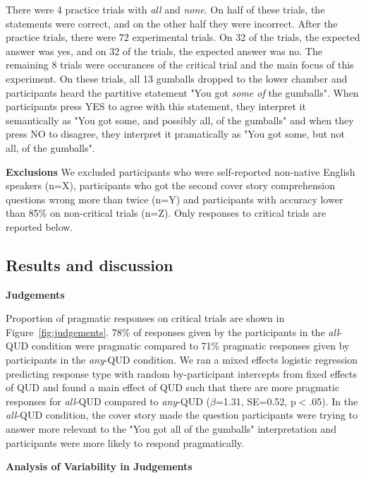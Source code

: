 \documentclass[10pt,letterpaper]{article}
\begin{document}
There were 4 practice trials with \textit{all} and \textit{none}. On half of these trials, the statements were correct, and on the other half they were incorrect. After the practice trials, there were 72 experimental trials. On 32 of the trials, the expected answer was yes, and on 32 of the trials, the expected answer was no. The remaining 8 trials were occurances of the critical trial and the main focus of this experiment. On these trials, all 13 gumballs dropped to the lower chamber and participants heard the partitive statement "You got \textit{some of} the gumballs". When participants press YES to agree with this statement, they interpret it semantically as "You got some, and possibly all, of the gumballs" and when they press NO to disagree, they interpret it pramatically as "You got some, but not all, of the gumballs". 

\noindent \textbf{Exclusions} We excluded participants who were self-reported non-native English speakers (n=X), participants who got the second cover story comprehension questions wrong more than twice (n=Y) and participants with accuracy lower than 85\% on non-critical trials (n=Z). Only responses to critical trials are reported below.


\subsection{Results and discussion}

\noindent \textbf{Judgements}

Proportion of pragmatic responses on critical trials are shown in Figure~\ref{fig:judgements}. 78\% of responses given by the participants in the \textit{all}-QUD condition were pragmatic compared to 71\% pragmatic responses given by participants in the \textit{any}-QUD condition. We ran a mixed effects logistic regression predicting response type with random by-participant intercepts from fixed effects of QUD and found a main effect of QUD such that there are more pragmatic responses for \textit{all}-QUD compared to \textit{any}-QUD ($\beta$=1.31, SE=0.52, p$<$.05). In the \textit{all}-QUD condition, the cover story made the question participants were trying to answer more relevant to the "You got all of the gumballs" interpretation and participants were more likely to respond pragmatically.

\noindent \textbf{Analysis of Variability in Judgements} 
\end{document}
